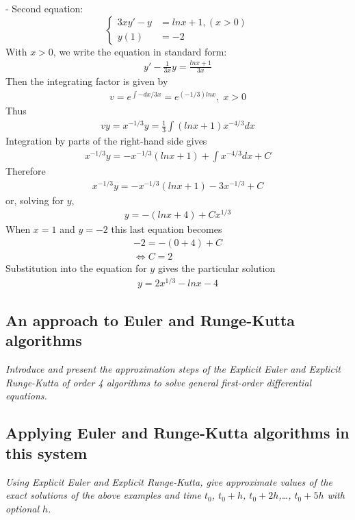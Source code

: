\documentclass[a4paper]{article}
\begin{document}
- Second equation:
\begin{equation*}
  \begin{cases}
    3xy' - y & = lnx + 1, (x > 0) \\
    y(1)     & = -2
  \end{cases}
\end{equation*}
With \(x > 0\), we write the equation in standard form:
\begin{gather*}
  y' - \frac{1}{3x}y = \frac{lnx + 1}{3x}
\end{gather*}
Then the integrating factor is given by
\begin{gather*}
  v = e^{\int -dx/3x} = e^{(-1/3)lnx},\;x > 0
\end{gather*}
Thus
\begin{gather*}
  vy = x^{-1/3} y = \frac{1}{3} \int(lnx + 1) x^{-4/3} dx
\end{gather*}
Integration by parts of the right-hand side gives
\begin{gather*}
  x^{-1/3}y = -x^{-1/3}(lnx+1) + \int x^{-4/3}dx + C
\end{gather*}
Therefore
\begin{gather*}
  x^{-1/3}y = -x^{-1/3}(lnx+1) - 3x^{-1/3} + C
\end{gather*}
or, solving for \(y\),
\begin{gather*}
  y = -(lnx + 4) + Cx^{1/3}
\end{gather*}
When \(x = 1\) and \(y = -2\) this last equation becomes
\begin{gather*}
  -2 = -(0+4) + C \\
  \Leftrightarrow C = 2
\end{gather*}
Substitution into the equation for \(y\) gives the particular solution
\begin{gather*}
  y = 2x^{1/3} - lnx - 4
\end{gather*}


\subsection{An approach to Euler and Runge-Kutta algorithms}
\textit{Introduce and present the approximation steps of the Explicit Euler and Explicit Runge-Kutta of order 4 algorithms to solve general first-order differential equations.}



\subsection{Applying Euler and Runge-Kutta algorithms in this system}
\textit{Using Explicit Euler and Explicit Runge-Kutta, give approximate values of the exact solutions of the above examples and time \(t_0\), \(t_0 + h\), \(t_0 + 2h\),\dots, \(t_0 + 5h\) with optional \(h\).}
\end{document}
